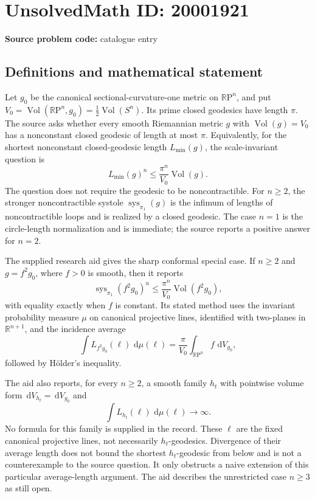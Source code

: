 \documentclass[11pt]{article}
\newcommand{\R}{\mathbb{R}}
\newcommand{\dd}{\,\mathrm{d}}
\begin{document}
\section*{UnsolvedMath ID: 20001921}
\textbf{Source problem code:} catalogue entry
\subsection{Definitions and mathematical statement}
Let \(g_0\) be the canonical sectional-curvature-one metric on \(\R\mathrm P^n\), and put \(V_0=\operatorname{Vol}(\R\mathrm P^n,g_0)=\tfrac12\operatorname{Vol}(S^n)\). Its prime closed geodesics have length \(\pi\). The source asks whether every smooth Riemannian metric \(g\) with \(\operatorname{Vol}(g)=V_0\) has a nonconstant closed geodesic of length at most \(\pi\). Equivalently, for the shortest nonconstant closed-geodesic length \(L_{\min}(g)\), the scale-invariant question is
\[
L_{\min}(g)^n\leq\frac{\pi^n}{V_0}\operatorname{Vol}(g).
\]
The question does not require the geodesic to be noncontractible. For \(n\geq2\), the stronger noncontractible systole \(\operatorname{sys}_{\pi_1}(g)\) is the infimum of lengths of noncontractible loops and is realized by a closed geodesic. The case \(n=1\) is the circle-length normalization and is immediate; the source reports a positive answer for \(n=2\).

The supplied research aid gives the sharp conformal special case. If \(n\geq2\) and \(g=f^2g_0\), where \(f>0\) is smooth, then it reports
\[
\operatorname{sys}_{\pi_1}(f^2g_0)^n
\leq\frac{\pi^n}{V_0}\operatorname{Vol}(f^2g_0),
\]
with equality exactly when \(f\) is constant. Its stated method uses the invariant probability measure \(\mu\) on canonical projective lines, identified with two-planes in \(\R^{n+1}\), and the incidence average
\[
\int L_{f^2g_0}(\ell)\,\dd\mu(\ell)
=\frac\pi{V_0}\int_{\R\mathrm P^n}f\,\dd V_{g_0},
\]
followed by H\"older's inequality.

The aid also reports, for every \(n\geq2\), a smooth family \(h_t\) with pointwise volume form \(\dd V_{h_t}=\dd V_{g_0}\) and
\[
\int L_{h_t}(\ell)\,\dd\mu(\ell)\longrightarrow\infty.
\]
No formula for this family is supplied in the record. These \(\ell\) are the fixed canonical projective lines, not necessarily \(h_t\)-geodesics. Divergence of their average length does not bound the shortest \(h_t\)-geodesic from below and is not a counterexample to the source question. It only obstructs a naive extension of this particular average-length argument. The aid describes the unrestricted case \(n\geq3\) as still open.
\end{document}
